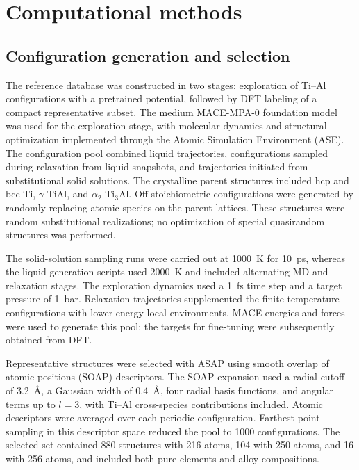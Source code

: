 \section{Computational methods}
\label{sec:methods}

\subsection{Configuration generation and selection}
\label{sec:configurations}

The reference database was constructed in two stages: exploration of Ti--Al configurations with a pretrained potential, followed by DFT labeling of a compact representative subset.
The medium MACE-MPA-0 foundation model was used for the exploration stage,\cite{Batatia2025} with molecular dynamics and structural optimization implemented through the Atomic Simulation Environment (ASE).\cite{Larsen2017}
The configuration pool combined liquid trajectories, configurations sampled during relaxation from liquid snapshots, and trajectories initiated from substitutional solid solutions.
The crystalline parent structures included hcp and bcc Ti, $\gamma$-TiAl, and $\alpha_2$-Ti$_3$Al.
Off-stoichiometric configurations were generated by randomly replacing atomic species on the parent lattices.
These structures were random substitutional realizations; no optimization of special quasirandom structures was performed.

The solid-solution sampling runs were carried out at 1000~K for 10~ps, whereas the liquid-generation scripts used 2000~K and included alternating MD and relaxation stages.
The exploration dynamics used a 1~fs time step and a target pressure of 1~bar.
Relaxation trajectories supplemented the finite-temperature configurations with lower-energy local environments.
MACE energies and forces were used to generate this pool; the targets for fine-tuning were subsequently obtained from DFT.

Representative structures were selected with ASAP\cite{Cheng2020} using smooth overlap of atomic positions (SOAP) descriptors.\cite{Bartok2013}
The SOAP expansion used a radial cutoff of 3.2~\AA, a Gaussian width of 0.4~\AA, four radial basis functions, and angular terms up to $l=3$, with Ti--Al cross-species contributions included.
Atomic descriptors were averaged over each periodic configuration.
Farthest-point sampling in this descriptor space reduced the pool to 1000 configurations.
The selected set contained 880 structures with 216 atoms, 104 with 250 atoms, and 16 with 256 atoms, and included both pure elements and alloy compositions.

